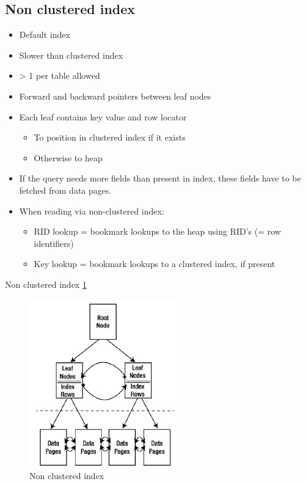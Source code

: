 \documentclass{report}
\begin{document}
    \subsection{Non clustered index}
        \begin{itemize} 
            \item Default index
            \item Slower than clustered index
            \item > 1 per table allowed
            \item Forward and backward pointers between leaf nodes
            \item Each leaf contains key value and row locator
            \begin{itemize} 
                \item To position in clustered index if it exists
                \item Otherwise to heap
            \end{itemize}
            \item If the query needs more fields than present in index, these fields have to be fetched from data pages.
            \item When reading via non-clustered index:
                \begin{itemize} 
                    \item RID lookup = bookmark lookups to the heap using RID's (= row identifiers)
                    \item Key lookup = bookmark lookups to a clustered index, if present
                \end{itemize}
        \end{itemize}
        Non clustered index \ref{fig:non-clustered_index}
        \begin{figure}
            \includegraphics[width=180pt]{./images/non-clustered index.png}
            \caption{\label{fig:non-clustered_index}Non clustered index}
        \end{figure}
\end{document}
